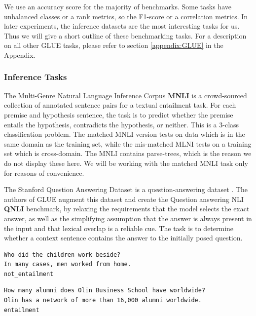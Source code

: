 \documentclass[a4paper,12pt,oneside,openright]{report}
\begin{document}
We use an accuracy score for the majority of benchmarks. 
Some tasks have unbalanced classes or a rank metrics, so the F1-score or a correlation metrics. 
In later experiments, the inference datasets are the most interesting tasks for us. 
Thus we will give a short outline of these benchmarking tasks. 
For a description on all other GLUE tasks, please refer to section \ref{appendix:GLUE} in the Appendix.

\subsubsection{Inference Tasks}

The Multi-Genre Natural Language Inference Corpus \textbf{MNLI} \cite{N18-1101} \cite{bowman2015} is a crowd-sourced collection of annotated sentence pairs for a textual entailment task.
For each premise and hypothesis sentence, the task is to predict whether the premise entails the hypothesis, contradicts the hypothesis, or neither.
This is a 3-class classification problem.
The matched MNLI version tests on data which is in the same domain as the training set, while the mis-matched MLNI tests on a training set which is cross-domain.
The MNLI contains parse-trees, which is the reason we do not display these here.
We will be working with the matched MNLI task only for reasons of convenience.

The Stanford Question Answering Dataset is a question-answering dataset \cite{rajpurkar2016}. 
The authors of GLUE augment this dataset and create the Question answering NLI \textbf{QNLI} benchmark, by relaxing the requirements that the model selects the exact answer, as well as the simplifying assumption that the answer is always present in the input and that lexical overlap is a reliable cue.
The task is to determine whether a context sentence contains the answer to the initially posed question. 

\begin{tcolorbox}
\begin{verbatim}
Who did the children work beside?	
In many cases, men worked from home.
not_entailment
\end{verbatim}
\end{tcolorbox}

\begin{tcolorbox}
\begin{verbatim}
How many alumni does Olin Business School have worldwide?
Olin has a network of more than 16,000 alumni worldwide.
entailment
\end{verbatim}
\end{tcolorbox}
\end{document}
